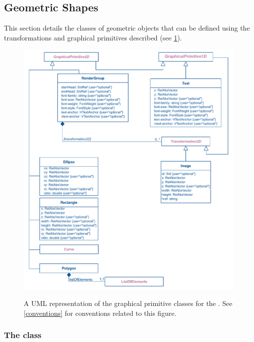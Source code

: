 \subsection{Geometric Shapes}
\label{shapes}

This section details the classes of geometric objects that can be defined using 
the transformations and graphical primitives described (see \ref{fig:group_render_uml}).

\begin{figure}[h!]
  \centering
  \includegraphics{images/render-group-uml}\\
  \caption{A UML representation of the graphical primitive classes for the \RenderPackage.  See \ref{conventions} for conventions related to this figure. }
  \label{fig:group_render_uml}
\end{figure}


\subsubsection{The  class}
\label{polygon-class}

